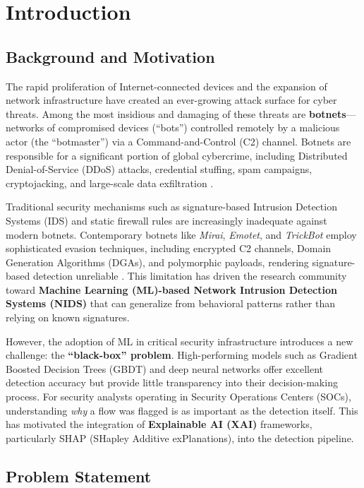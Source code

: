 \chapter{Introduction}

\section{Background and Motivation}

The rapid proliferation of Internet-connected devices and the expansion of network infrastructure have created an ever-growing attack surface for cyber threats. Among the most insidious and damaging of these threats are \textbf{botnets}---networks of compromised devices (``bots'') controlled remotely by a malicious actor (the ``botmaster'') via a Command-and-Control (C2) channel. Botnets are responsible for a significant portion of global cybercrime, including Distributed Denial-of-Service (DDoS) attacks, credential stuffing, spam campaigns, cryptojacking, and large-scale data exfiltration \cite{mirkovic2004taxonomy}.

Traditional security mechanisms such as signature-based Intrusion Detection Systems (IDS) and static firewall rules are increasingly inadequate against modern botnets. Contemporary botnets like \textit{Mirai}, \textit{Emotet}, and \textit{TrickBot} employ sophisticated evasion techniques, including encrypted C2 channels, Domain Generation Algorithms (DGAs), and polymorphic payloads, rendering signature-based detection unreliable \cite{antonakakis2017understanding}. This limitation has driven the research community toward \textbf{Machine Learning (ML)-based Network Intrusion Detection Systems (NIDS)} that can generalize from behavioral patterns rather than relying on known signatures.

However, the adoption of ML in critical security infrastructure introduces a new challenge: the \textbf{``black-box'' problem}. High-performing models such as Gradient Boosted Decision Trees (GBDT) and deep neural networks offer excellent detection accuracy but provide little transparency into their decision-making process. For security analysts operating in Security Operations Centers (SOCs), understanding \textit{why} a flow was flagged is as important as the detection itself. This has motivated the integration of \textbf{Explainable AI (XAI)} frameworks, particularly SHAP (SHapley Additive exPlanations), into the detection pipeline.

\section{Problem Statement}

